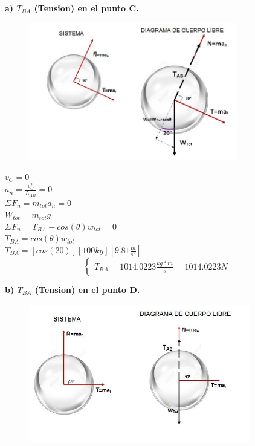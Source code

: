 \documentclass[a4paper,11pt]{scrartcl}
\begin{document}
\begin{center}
\textbf{a) $T_{BA}$ (Tension) en el punto C.}\\

\begin{figure}[H]
  \centering
  \includegraphics[height=6cm]{27_3}
  \label{fig:27_3}
\end{figure}

$v_C = 0$\\
\hfill \break
$a_n = \frac{v_C^2}{L_{AB}} = 0$\\
\hfill \break
$\Sigma F_n = m_{tot} a_n = 0$\\
\hfill \break
$W_{tot} = m_{tot} g$\\
\hfill \break
$\Sigma F_n = T_{BA} - cos(\theta)w_{tot} = 0$\\
\hfill \break
$T_{BA} = cos(\theta)w_{tot}$\\
\hfill \break
$T_{BA} = [cos(20)][100 kg][9.81 \frac{m}{s^2}]$\\

\begin{equation}
  \left\lbrace
  \begin{array}{l}
    T_{BA} = 1014.0223 \frac{kg*m}{s} = 1014.0223 N
  \end{array}
  \right.
\end{equation}

\textbf{b) $T_{BA}$ (Tension) en el punto D.}\\

\begin{figure}[H]
  \centering
  \includegraphics[height=6cm]{27_2}
  \label{fig:27_2}
\end{figure}


\end{center}
\end{document}
